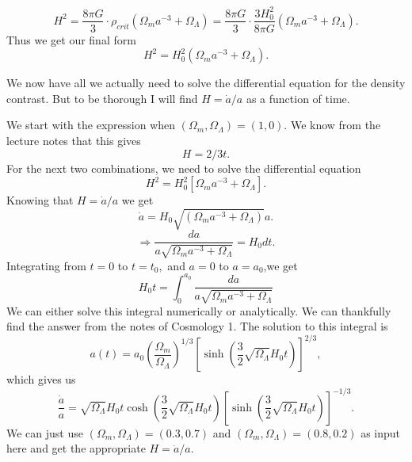 \documentclass[a4paper,norsk, 10pt]{article}
\begin{document}
\begin{equation}
H^2 = \frac{8\pi G}{3}\cdot\rho_{crit}(\Omega_{m}a^{-3} + \Omega_{\Lambda}) = \frac{8\pi G}{3}\cdot\frac{3H_{0}^2}{8\pi G}(\Omega_{m}a^{-3} + \Omega_{\Lambda}).
\end{equation}
Thus we get our final form
\begin{equation}
H^2 = H_0^2(\Omega_{m}a^{-3} + \Omega_{\Lambda}).
\end{equation}




We now have all we actually need to solve the differential equation for the density contrast. But to be thorough I will find $H=\dot{a}/a$ as a function of time.

We start with the expression when $(\Omega_{m},\Omega_{\Lambda}) = (1,0)$. We know from the lecture notes that this gives
\begin{equation}\label{eq:o_m=1}
H = 2/3t.
\end{equation}
For the next two combinations, we need to solve the differential equation
\begin{equation}\label{eq:H^2}
H^2 = H_0^2\left[{\Omega_{m}}{a^{-3}} + \Omega_{\Lambda}\right].
\end{equation}
Knowing that $H=\dot{a}/a$ we get
\begin{equation}\label{eq:a_dot}
\dot{a} = H_0\sqrt{\left({\Omega_{m}}{a^{-3}} + \Omega_{\Lambda}\right)}a.
\end{equation}
\begin{equation}
\Rightarrow \frac{da}{a\sqrt{{\Omega_{m}}{a^{-3}} + \Omega_{\Lambda}}} = H_0dt.
\end{equation}
Integrating from $t = 0$ to $t=t_0,$ and $a=0$ to $a=a_0$,we get
\begin{equation}
H_0t =  \int_0^{a_0}\frac{da}{a\sqrt{{\Omega_{m}}{a^{-3}} + \Omega_{\Lambda}}}
\end{equation}
We can either solve this integral numerically or analytically. We can thankfully find the answer from the notes of Cosmology 1. The solution to this integral is
\begin{equation}
a(t) = a_0\left(\frac{\Omega_{m}}{\Omega_{\Lambda}}\right)^{1/3}\left[\sinh\left(\frac{3}{2}\sqrt{\Omega_{\Lambda}}H_0 t\right)\right]^{2/3},
\end{equation} 
which gives us
\begin{equation}\label{o_m<1}
\frac{\dot{a}}{a} = \sqrt{\Omega_{\Lambda}}H_0 t\cosh\left(\frac{3}{2}\sqrt{\Omega_{\Lambda}}H_0 t\right)\left[\sinh\left(\frac{3}{2}\sqrt{\Omega_{\Lambda}}H_0 t\right)\right]^{-1/3}.
\end{equation}
We can just use $(\Omega_{m},\Omega_{\Lambda}) = (0.3,0.7)$ and $(\Omega_{m},\Omega_{\Lambda}) = (0.8,0.2)$ as input here and get the appropriate $H = \dot{a}/a$.
\end{document}
